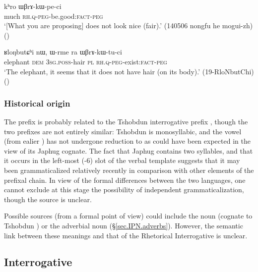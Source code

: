 \begin{exe}
\ex \label{ex:khro.WBrAkWpeci}
 \gll kʰro ɯβrɤ-kɯ-pe-ci \\
 much \textsc{rh}.\textsc{q}-\textsc{peg}-be.good:\textsc{fact}-\textsc{peg} \\
\glt `[What you are proposing] does not look nice (fair).' (140506 nongfu he mogui-zh) ()
\end{exe}

\begin{exe}
\ex \label{ex:WBrAkWtuci}
 \gll ʁloŋbutɕʰi nɯ, ɯ-rme ra ɯβrɤ-kɯ-tu-ci \\
 elephant \textsc{dem} \textsc{3sg}.\textsc{poss}-hair \textsc{pl} \textsc{rh}.\textsc{q}-\textsc{peg}-exist:\textsc{fact}-\textsc{peg} \\
\glt `The elephant, it seems that it does not have hair (on its body).' (19-RloNbutChi) ()
\end{exe}


\subsubsection{Historical origin} \label{sec:WBrA.history}
The prefix  is probably related to the Tshobdun interrogative prefix   \citep[397]{jackson19tshobdun}, though the two prefixes are not entirely similar: Tshobdun  is monosyllabic, and the vowel  (from ealier ) has not undergone reduction to  as could have been expected in the view of its Japhug cognate. The fact that Japhug  contains two syllables, and that it occurs in the left-most (-6) slot of the verbal template suggests that it may been grammaticalized relatively recently in comparison with other elements of the prefixal chain. In view of the formal differences between the two languages, one cannot exclude at this stage the possibility of independent grammaticalization, though the source is unclear. 

Possible sources (from a formal point of view) could include the noun  (cognate to Tshobdun ) or the  adverbial noun  (§\ref{sec.IPN.adverbs}). However, the semantic link between these meanings and that of the Rhetorical Interrogative is unclear. 

 \subsection{Interrogative} \label{sec:interrogative.W} 

